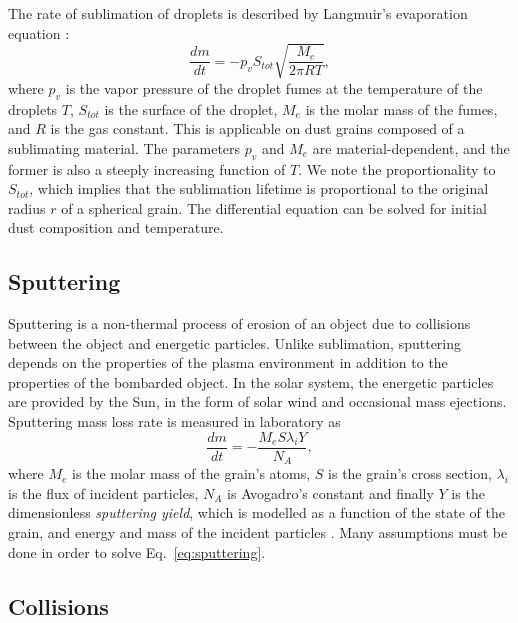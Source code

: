 The rate of sublimation of droplets is described by Langmuir's evaporation equation \citep{langmuir1918evaporation}:
\begin{equation}
    \frac{dm}{dt} = -p_{v} S_{tot} \sqrt{\frac{M_e}{2\pi RT}},
\end{equation}
where $p_v$ is the vapor pressure of the droplet fumes at the temperature of the droplets $T$, $S_{tot}$ is the surface of the droplet, $M_e$ is the molar mass of the fumes, and $R$ is the gas constant. This is applicable on dust grains composed of a sublimating material. The parameters $p_v$ and $M_e$ are material-dependent, and the former is also a steeply increasing function of $T$. We note the proportionality to $S_{tot}$, which implies that the sublimation lifetime is proportional to the original radius $r$ of a spherical grain. The differential equation can be solved for initial dust composition and temperature.   

\subsection{Sputtering}

Sputtering is a non-thermal process of erosion of an object due to collisions between the object and energetic particles. Unlike sublimation, sputtering depends on the properties of the plasma environment in addition to the properties of the bombarded object. In the solar system, the energetic particles are provided by the Sun, in the form of solar wind and occasional mass ejections. Sputtering mass loss rate is measured in laboratory as
\begin{equation}
    \frac{dm}{dt} = - \frac{ M_e S \lambda_i Y }{N_A}, 
    \label{eq:sputtering}
\end{equation}
where $M_e$ is the molar mass of the grain's atoms, $S$ is the grain's cross section, $\lambda_i$ is the flux of incident particles, $N_A$ is Avogadro's constant and finally $Y$ is the dimensionless \textit{sputtering yield}, which is modelled as a function of the state of the grain, and energy and mass of the incident particles \citep{vyvsinka2018odpravsovani}. Many assumptions must be done in order to solve Eq.~\ref{eq:sputtering}. 

\subsection{Collisions} \label{ch:collisions}

